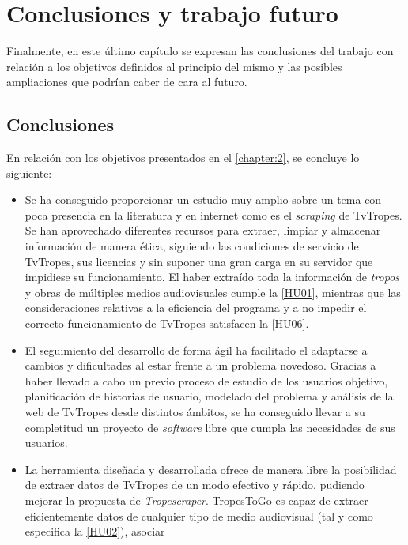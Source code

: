 \chapter{Conclusiones y trabajo futuro}
Finalmente, en este último capítulo se expresan las conclusiones del trabajo con
relación a los objetivos definidos al principio del mismo y las posibles
ampliaciones que podrían caber de cara al futuro.

\section{Conclusiones}
En relación con los objetivos presentados en el \autoref{chapter:2}, se concluye
lo siguiente:
\begin{itemize}
    \item Se ha conseguido proporcionar un estudio muy amplio sobre un tema con
    poca presencia en la literatura y en internet como es el \textit{scraping}
    de TvTropes. Se han aprovechado diferentes recursos para extraer, limpiar y
    almacenar información de manera ética, siguiendo las condiciones de servicio
    de TvTropes, sus licencias y sin suponer una gran carga en su servidor que
    impidiese su funcionamiento. El haber extraído toda la información de
    \textit{tropos} y obras de múltiples medios audiovisuales cumple la
    \href{https://github.com/jlgallego99/TropesToGo/issues/6}{[HU01]}, mientras
    que las consideraciones relativas a la eficiencia del programa y a no
    impedir el correcto funcionamiento de TvTropes satisfacen la
    \href{https://github.com/jlgallego99/TropesToGo/issues/45}{[HU06]}. 
    \item El seguimiento del desarrollo de forma ágil ha facilitado el adaptarse
    a cambios y dificultades al estar frente a un problema novedoso. Gracias a
    haber llevado a cabo un previo proceso de estudio de los usuarios objetivo,
    planificación de historias de usuario, modelado del problema y análisis de
    la web de TvTropes desde distintos ámbitos, se ha conseguido llevar a su
    completitud un proyecto de \textit{software} libre que cumpla las
    necesidades de sus usuarios.
    \item La herramienta diseñada y desarrollada ofrece de manera libre la
    posibilidad de extraer datos de TvTropes de un modo efectivo y rápido,
    pudiendo mejorar la propuesta de \textit{Tropescraper}. TropesToGo es capaz
    de extraer eficientemente datos de cualquier tipo de medio audiovisual (tal
    y como especifica la
    \href{https://github.com/jlgallego99/TropesToGo/issues/7}{[HU02]}), asociar

\end{itemize}
